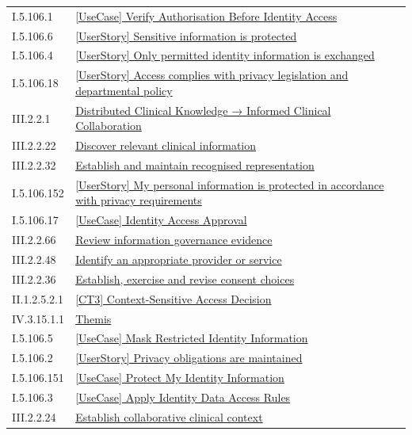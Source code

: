 \begin{longtable}{p{.22\linewidth}p{.73\linewidth}}
I.5.106.1 & \hyperref[element:05e4e3379f274ae6b5d4c53ad9308d72]{[UseCase] Verify Authorisation Before Identity Access} \\
I.5.106.6 & \hyperref[element:0e551b5c2f084f4391034a862b3e9a1d]{[UserStory] Sensitive information is protected} \\
I.5.106.4 & \hyperref[element:1bab0a5e210d4f97a43f30153ac492ec]{[UserStory] Only permitted identity information is exchanged} \\
I.5.106.18 & \hyperref[element:2d2bf18c738e4cf28a545825234d38e5]{[UserStory] Access complies with privacy legislation and departmental policy} \\
III.2.2.1 & \hyperref[element:3ba98c0c1170458f8c02fa76694fee67]{Distributed Clinical Knowledge → Informed Clinical Collaboration} \\
III.2.2.22 & \hyperref[element:413213f085b44715a309f39b55ee3ee6]{Discover relevant clinical information} \\
III.2.2.32 & \hyperref[element:45372a8e0fc64dd3ba0f2cc4b14b0ee3]{Establish and maintain recognised representation} \\
I.5.106.152 & \hyperref[element:4888640181774cd6955f47c81f627cfc]{[UserStory] My personal information is protected in accordance with privacy requirements} \\
I.5.106.17 & \hyperref[element:4a007d8c835141a1a6cb123d00d74763]{[UseCase] Identity Access Approval} \\
III.2.2.66 & \hyperref[element:558e014abfce4750996f92473380284d]{Review information governance evidence} \\
III.2.2.48 & \hyperref[element:5d725d797f754857bf1b3d49d8f25044]{Identify an appropriate provider or service} \\
III.2.2.36 & \hyperref[element:850bba32295c4e53b20036b80f77f491]{Establish, exercise and revise consent choices} \\
II.1.2.5.2.1 & \hyperref[element:8719d8ed49f940cfbba2d26ae14ea54d]{[CT3] Context-Sensitive Access Decision} \\
IV.3.15.1.1 & \hyperref[element:899d34ec491948b68aad09e507dea6d1]{Themis} \\
I.5.106.5 & \hyperref[element:ab6d4b27f76a496b93147c2e672fb944]{[UseCase] Mask Restricted Identity Information} \\
I.5.106.2 & \hyperref[element:c164f3e11ec24376b2f0c62f7e98b861]{[UserStory] Privacy obligations are maintained} \\
I.5.106.151 & \hyperref[element:cd87770b776b4505824314f5de0c7456]{[UseCase] Protect My Identity Information} \\
I.5.106.3 & \hyperref[element:d17ee8dba9654798ba50c38523aa5b73]{[UseCase] Apply Identity Data Access Rules} \\
III.2.2.24 & \hyperref[element:e453905e7aef4db2aba07de5efc932bc]{Establish collaborative clinical context} \\
\end{longtable}
